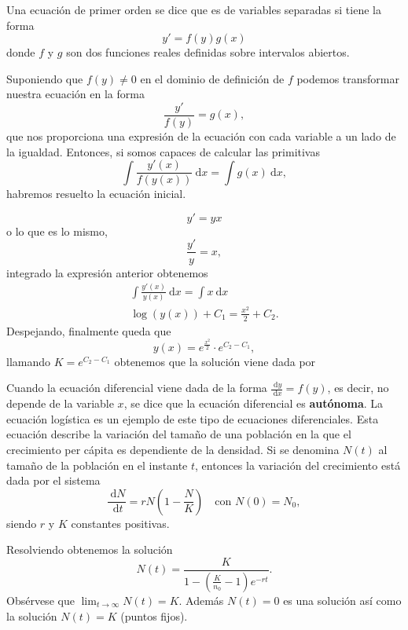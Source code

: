 Una ecuación de primer orden se dice que es de variables separadas si tiene la forma 
$$
y'=f(y)g(x)
$$
donde $f$ y $g$ son dos funciones reales definidas sobre intervalos abiertos.

Suponiendo que $f(y)\neq 0$ en el dominio de definición de $f$ podemos transformar nuestra ecuación en la forma
$$
\frac{y'}{f(y)}=g(x),
$$
que nos proporciona una expresión de la ecuación con cada variable a un lado de la igualdad. Entonces, si somos capaces de calcular las primitivas
$$
\int \frac{y'(x)}{f(y(x))}\:\mathrm{d}x=\int g(x)\:\mathrm{d}x,
$$
habremos resuelto la ecuación inicial.


$$
y'=yx
$$
o lo que es lo mismo,
$$
\frac{y'}{y}=x,
$$
integrado la expresión anterior obtenemos
$$
\begin{array}{c}
\int \frac{y'(x)}{y(x)}\:\mathrm{d}x=\int x\:\mathrm{d}x \\
\log(y(x))+C_{1}=\frac{x^{2}}{2}+C_{2}.
\end{array}
$$
Despejando, finalmente queda que
$$
y(x)=e^{ \frac{x^{2}}{2} }\cdot e^{ C_{2}-C_{1} },
$$
llamando $K=e^{ C_{2}-C_{1} }$ obtenemos que la solución viene dada por

Cuando la ecuación diferencial viene dada de la forma $\frac{\:\mathrm{d}y}{\:\mathrm{d}x}=f(y)$, es decir, no depende de la variable $x$, se dice que la ecuación diferencial es \textbf{autónoma}. La ecuación logística es un ejemplo de este tipo de ecuaciones diferenciales. Esta ecuación describe la variación del tamaño de una población en la que el crecimiento per cápita es dependiente de la densidad. Si se denomina $N(t)$ al tamaño de la población en el instante $t$, entonces la variación del crecimiento está dada por el sistema 
$$
\frac{\:\mathrm{d}N}{\:\mathrm{d}t}=rN\left( 1-\frac{N}{K} \right)\quad \text{con }N(0)=N_{0},
$$
siendo $r$ y $K$ constantes positivas.

Resolviendo obtenemos la solución
$$
N(t)=\frac{K}{1-\left( \frac{K}{n_{0}}-1 \right)e^{ -rt }}.
$$
Obsérvese que $\lim_{ t \to \infty }N(t)=K$. Además $N(t)=0$ es una solución así como la solución $N(t)=K$ (puntos fijos).